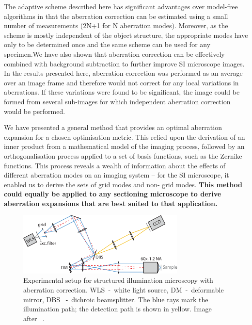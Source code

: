 The adaptive scheme described here has significant advantages over model-free 
algorithms in that the aberration correction can be estimated using a small 
number of measurements (2N+1 for N aberration modes). Moreover, as the scheme 
is mostly independent of the object structure, the appropriate modes have 
only to be determined once and the same scheme can be used for any 
specimen.We have also shown that aberration correction can be effectively 
combined with background subtraction to further improve SI microscope images. 
In the results presented here, aberration correction was performed as an 
average over an image frame and therefore would not correct for any local 
variations in aberrations. If these variations were found to be significant, 
the image could be formed from several sub-images for which independent 
aberration correction would be performed.

We have presented a general method that provides an optimal aberration 
expansion for a chosen optimisation metric. This relied upon the derivation 
of an inner product from a mathematical model of the imaging process, 
followed by an orthogonalisation process applied to a set of basis functions, 
such as the Zernike functions. This process reveals a wealth of information 
about the effects of different aberration modes on an imaging system – for 
the SI microscope, it enabled us to derive the sets of grid modes and non-
grid modes. \textbf{This method could equally be applied to any sectioning 
microscope to derive aberration expansions that are best suited to that 
application.
}
\begin{figure}
	\centering
		\includegraphics[width=0.75\textwidth]{images/wide_structured_illumination.pdf}
	\caption{Experimental setup for structured illumination microscopy with 
aberration correction. WLS~-~white light source, DM~-~deformable mirror, DBS
~-~dichroic beamsplitter. The blue rays mark the illumination path; the 
detection path is shown in yellow. Image after~\cite{wide_AOM_structured_illu}
.}
	\label{fig:wide_structured_illumination}
\end{figure}

